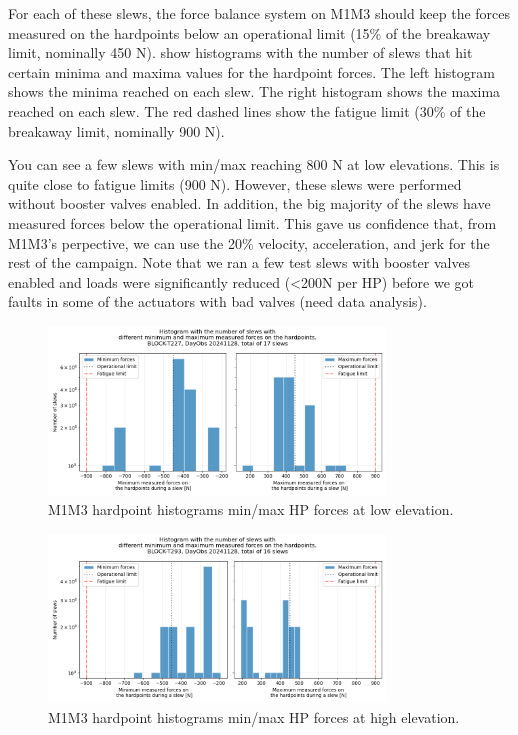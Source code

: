 For each of these slews, the force balance system on M1M3 should keep the forces
measured on the hardpoints below an operational limit (15\% of the breakaway limit, nominally 450 N).
show histograms with the number of slews that hit certain minima
and maxima values for the hardpoint forces. The left histogram shows the minima
reached on each slew. The right histogram shows the maxima reached on each slew.
The red dashed lines show the fatigue limit (30\% of the breakaway limit, nominally 900 N).

You can see a few slews with min/max reaching 800 N at low elevations.
This is quite close to fatigue limits (900 N).
However, these slews were performed without booster valves enabled.
In addition, the big majority of the slews have measured forces below the operational limit.
This gave us confidence that, from M1M3's perpective, we can use the 20\% velocity, acceleration, and jerk for the rest of the campaign.
Note that we ran a few test slews with booster valves enabled and loads were significantly reduced (<200N per HP) before we got faults in some of the actuators with bad valves (need data analysis).

\begin{figure}
    \centering
    \includegraphics[width=0.8\textwidth]{spa/20_vel_acc_jerk/BLOCK-T227_m1m3_hp_histograms.png}
    \caption{M1M3 hardpoint histograms min/max HP forces at low elevation.}
    \label{fig:block227_m1m3_hp_histograms}
    \end{figure}

\begin{figure}
    \centering
    \includegraphics[width=0.8\textwidth]{spa/20_vel_acc_jerk/BLOCK-T293_m1m3_hp_histograms.png}
    \caption{M1M3 hardpoint histograms min/max HP forces at high elevation.}
    \label{fig:block293_m1m3_hp_histograms}
    \end{figure}

